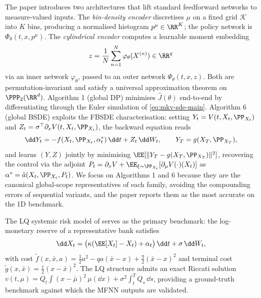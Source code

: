 \documentclass[11pt]{article}
\begin{document}
The paper introduces two architectures that lift standard feedforward networks to measure-valued inputs. The \emph{bin-density encoder} discretises $\mu$ on a fixed grid $\mathcal{K}$ into $K$ bins, producing a normalised histogram $p^\mu \in \RR^K$; the policy network is $\Phi_\theta(t, x, p^\mu)$. The \emph{cylindrical encoder} computes a learnable moment embedding
\begin{equation}\label{eq:cylindrical-main}
  z = \frac{1}{N}\sum_{n=1}^N \varphi_\theta(X^{(n)}) \in \RR^q
\end{equation}
via an inner network $\varphi_\theta$, passed to an outer network $\Psi_\theta(t, x, z)$. Both are permutation-invariant and satisfy a universal approximation theorem on $\PPP_2(\RR^d)$. Algorithm 1 (global DP) minimises $\hat{J}(\theta)$ end-to-end by differentiating through the Euler simulation of \eqref{eq:mkv-sde-main}. Algorithm 6 (global BSDE) exploits the FBSDE characterisation: setting $Y_t = V(t, X_t, \PP_{X_t})$ and $Z_t = \sigma^\top \partial_x V(t, X_t, \PP_{X_t})$, the backward equation reads
\begin{equation}\label{eq:bsde-main}
  \dd Y_t = -f(X_t, \PP_{X_t}, \alpha^*_t)\,\dd t + Z_t\,\dd W_t, \qquad Y_T = g(X_T, \PP_{X_T}),
\end{equation}
and learns $(Y, Z)$ jointly by minimising $\EE[\|Y_T - g(X_T, \PP_{X_T})\|^2]$, recovering the control via the adjoint $P_t = \partial_x V + \EE_{\xi \sim \PP_{X_t}}[\partial_\mu V(\cdot)(X_t)]$ as $\alpha^* = \hat{a}(X_t, \PP_{X_t}, P_t)$. We focus on Algorithms 1 and 6 because they are the canonical global-scope representatives of each family, avoiding the compounding errors of sequential variants, and the paper reports them as the most accurate on the 1D benchmark.

The LQ systemic risk model of \citet{carmona2015systemic} serves as the primary benchmark: the log-monetary reserve of a representative bank satisfies
\begin{equation}\label{eq:systemic-main}
  \dd X_t = \bigl(\kappa(\EE[X_t] - X_t) + \alpha_t\bigr)\,\dd t + \sigma\,\dd W_t,
\end{equation}
with cost $\tilde{f}(x,\bar x, a) = \tfrac{1}{2}a^2 - qa(\bar x - x) + \tfrac{\eta}{2}(\bar x - x)^2$ and terminal cost $\tilde{g}(x,\bar x) = \tfrac{c}{2}(x - \bar x)^2$. The LQ structure admits an exact Riccati solution $v(t,\mu) = Q_t \int(x-\bar\mu)^2\,\mu(\dd x) + \sigma^2\int_t^T Q_s\,\dd s$, providing a ground-truth benchmark against which the MFNN outputs are validated.
\end{document}
